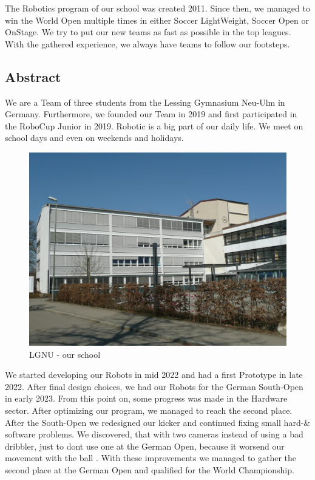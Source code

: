 \documentclass{scrartcl}
\begin{document}
The Robotics program of our school was created 2011. Since then, we managed to win the World Open
multiple times in either Soccer LightWeight, Soccer Open or OnStage.
We try to put our new teams as fast as possible in the top leagues. With the gathered experience, we always
have teams to follow our footsteps.
\newline
\subsection{Abstract}
We are a Team of three students from the Lessing Gymnasium Neu-Ulm in Germany. Furthermore, we founded our Team
in 2019 and first participated in the RoboCup Junior in 2019. Robotic is a big part of our daily life.
We meet on school days and even on weekends and holidays.

\begin{figure}[h]
    \centering
    \includegraphics[width=\textwidth]{img/lgnu.png}
    \caption{LGNU - our school}
    \label{fig:lgnu}
\end{figure}
We started developing our Robots in mid 2022 and had a first Prototype in late 2022. After final design
choices, we had our Robots for the German South-Open in early 2023. From this point on, some progress was
made in the Hardware sector.
After optimizing our program, we managed to reach the second place.
\newline
After the South-Open we redesigned our kicker and continued fixing small hard-\& software problems. We discovered, that with two cameras
instead of using a bad dribbler, just to dont use one at the German Open, because it worsend our movement with the ball .
With these improvements we managed to gather the second place at the German Open and qualified for the World Championship.
\end{document}
